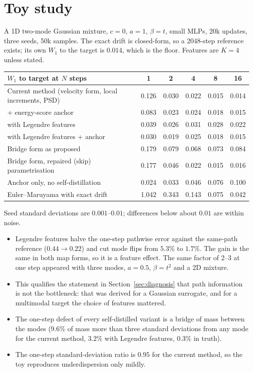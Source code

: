 \documentclass[11pt,a4paper]{article}
\begin{document}
\section{Toy study}\label{sec:toy}

A 1D two-mode Gaussian mixture, $c=0$, $a=1$, $\beta=t$, small MLPs, 20k updates, three seeds, 50k samples. The exact drift is closed-form, so a 2048-step reference exists; its own $W_1$ to the target is $0.014$, which is the floor. Features are $K=4$ unless stated.

\begin{center}\small
\begin{tabular}{lccccc}
\toprule
$W_1$ to target at $N$ steps & 1 & 2 & 4 & 8 & 16\\
\midrule
Current method (velocity form, local increments, PSD) & 0.126 & 0.030 & 0.022 & 0.015 & 0.014\\
\quad + energy-score anchor & 0.083 & 0.023 & 0.024 & 0.018 & 0.015\\
\quad with Legendre features & 0.039 & 0.026 & 0.031 & 0.028 & 0.022\\
\quad with Legendre features + anchor & 0.030 & 0.019 & 0.025 & 0.018 & 0.015\\
Bridge form as proposed & 0.179 & 0.079 & 0.068 & 0.073 & 0.084\\
Bridge form, repaired (skip) parametrisation & 0.177 & 0.046 & 0.022 & 0.015 & 0.016\\
Anchor only, no self-distillation & 0.024 & 0.033 & 0.046 & 0.076 & 0.100\\
Euler--Maruyama with exact drift & 1.042 & 0.343 & 0.143 & 0.075 & 0.042\\
\bottomrule
\end{tabular}
\end{center}

\noindent Seed standard deviations are $0.001$--$0.01$; differences below about $0.01$ are within noise.

\begin{itemize}
\item Legendre features halve the one-step pathwise error against the same-path reference ($0.44\to0.22$) and cut mode flips from $5.3\%$ to $1.7\%$. The gain is the same in both map forms, so it is a feature effect. The same factor of 2--3 at one step appeared with three modes, $a=0.5$, $\beta=t^2$ and a 2D mixture.
\item This qualifies the statement in Section~\ref{sec:diagnosis} that path information is not the bottleneck: that was derived for a Gaussian surrogate, and for a multimodal target the choice of features mattered.
\item The one-step defect of every self-distilled variant is a bridge of mass between the modes ($9.6\%$ of mass more than three standard deviations from any mode for the current method, $3.2\%$ with Legendre features, $0.3\%$ in truth).
\item The one-step standard-deviation ratio is $0.95$ for the current method, so the toy reproduces underdispersion only mildly.
\end{itemize}
\end{document}
